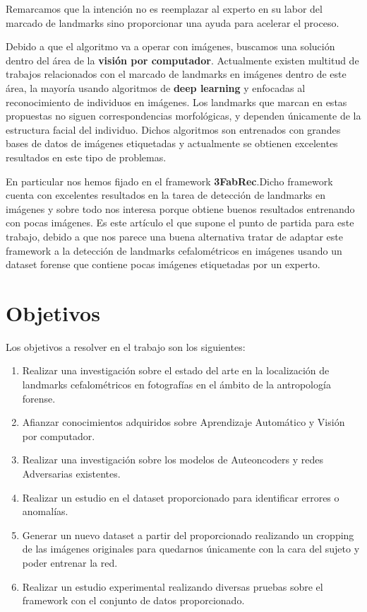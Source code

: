 \noindent Remarcamos que la intención no es reemplazar al experto en su labor del marcado de landmarks sino proporcionar una ayuda para acelerar el proceso.

\medskip 

\noindent Debido a que el algoritmo va a operar con imágenes, buscamos una solución dentro del área de la \textbf{visión por computador}. Actualmente existen  multitud de trabajos relacionados con el marcado de landmarks en imágenes dentro de este área, la mayoría usando algoritmos de \textbf{deep learning} y enfocadas al reconocimiento de individuos en imágenes. Los landmarks que marcan en estas propuestas no siguen correspondencias morfológicas, y dependen únicamente de la estructura facial del individuo. Dichos algoritmos son entrenados con grandes bases de datos de imágenes etiquetadas y actualmente se obtienen excelentes resultados en este tipo de problemas.

\medskip

\noindent En particular nos hemos fijado en el framework \textbf{3FabRec}\cite{browatzki20203fabrec}.Dicho framework cuenta con excelentes resultados en la tarea de detección de landmarks en imágenes y sobre todo nos interesa porque obtiene buenos resultados entrenando con pocas imágenes. Es este artículo el que supone el punto de partida para este trabajo, debido a que nos parece una buena alternativa tratar de adaptar este framework a la detección de landmarks cefalométricos en imágenes usando un dataset forense que contiene pocas imágenes etiquetadas por un experto.

\section{Objetivos}

\noindent Los objetivos a resolver en el trabajo son los siguientes: 

\begin{enumerate}
    \item Realizar una investigación sobre el estado del arte en la localización de landmarks cefalométricos en fotografías en el ámbito de la antropología forense.
    \item Afianzar conocimientos adquiridos sobre Aprendizaje Automático y Visión por computador.
    \item Realizar una investigación sobre los modelos de Auteoncoders y redes Adversarias existentes.
    \item Realizar un estudio en el dataset proporcionado para identificar errores o anomalías.
    \item Generar un nuevo dataset a partir del proporcionado realizando un cropping de las imágenes originales para quedarnos únicamente con la cara del sujeto y poder entrenar la red.
    \item Realizar un estudio experimental realizando diversas pruebas sobre el framework con el conjunto de datos proporcionado.
\end{enumerate}

